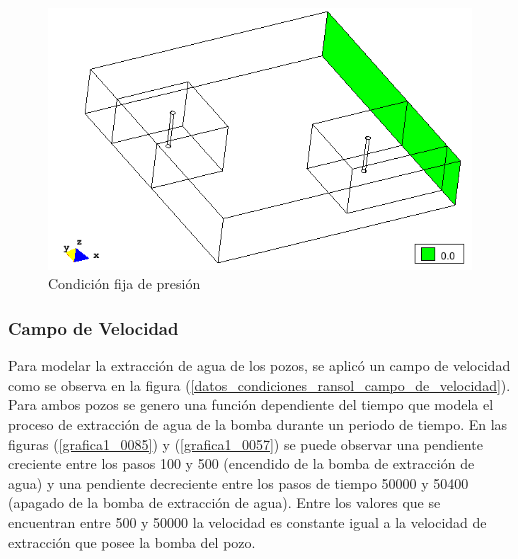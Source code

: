 \documentclass[10pt,a4paper,final]{article}
\begin{document}
\begin{figure}[tbhp]
\centerline{\includegraphics[scale=0.75]{img/datos_condiciones_ransol_presion}}
\caption{Condición fija de presión}
\label{datos_condiciones_ransol_presion}
\end{figure}
\subsubsection*{Campo de Velocidad}
Para modelar la extracción de agua de los pozos, se aplicó un campo de velocidad como se observa en la figura (\ref{datos_condiciones_ransol_campo_de_velocidad}).
Para ambos pozos se genero una función dependiente del tiempo que modela el proceso de extracción de agua de la bomba durante un periodo de tiempo. En las figuras (\ref{grafica1_0085}) y (\ref{grafica1_0057}) se puede observar una pendiente creciente entre los pasos 100 y 500 (encendido de la bomba de extracción de agua) y una pendiente decreciente entre los pasos de tiempo 50000 y 50400 (apagado de la bomba de extracción de agua).
Entre los valores que se encuentran entre 500 y 50000 la velocidad es constante igual a la velocidad de extracción que posee la bomba del pozo.
\end{document}
